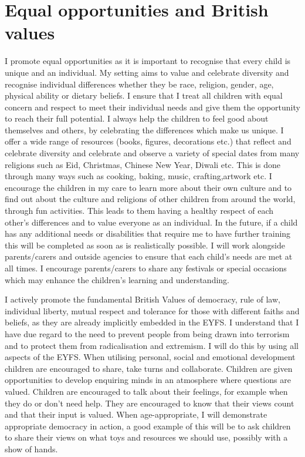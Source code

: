 \documentclass[10pt,a4paper]{report}
\begin{document}
\section{Equal opportunities and British values}

I promote equal opportunities as it is important to recognise that every child is unique and an individual. My setting aims to value and celebrate diversity and recognise individual differences whether they be race, religion, gender, age, physical ability or dietary beliefs. I ensure that I treat all children with equal concern and respect to meet their individual needs and give them the opportunity to reach their full potential. I always help the children to feel good about themselves and others, by celebrating the differences which make us unique. I offer a wide range of resources (books, figures, decorations etc.) that reflect and celebrate diversity and celebrate and observe a variety of special dates from many religions such as Eid, Christmas, Chinese New Year, Diwali etc. This is done through many ways such as cooking, baking, music, crafting,artwork etc. I encourage the children in my care to learn more about their own culture and to find out about the culture and religions of other children from around the world, through fun activities. This leads to them having a healthy respect of each other’s differences and to value everyone as an individual. In the future, if a child has any additional needs or disabilities that require me to have further training this will be completed as soon as is realistically possible. I will work alongside parents/carers and outside agencies to ensure that each child’s needs are met at all times. I encourage parents/carers to share any festivals or special occasions which may enhance the children’s learning and understanding.

I actively promote the fundamental British Values of democracy, rule of law, individual liberty, mutual respect and tolerance for those with different faiths and beliefs, as they are already implicitly embedded in the EYFS. I understand that I have due regard to the need to prevent people from being drawn into terrorism and to protect them from radicalisation and extremism. I will do this by using all aspects of the EYFS. When utilising personal, social and emotional development children are encouraged to share, take turns and collaborate. Children are given opportunities to develop enquiring minds in an atmosphere where questions are valued. Children are encouraged to talk about their feelings, for example when they do or don't need help. They are encouraged to know that their views count and that their input is valued. When age-appropriate, I will demonstrate appropriate democracy in action, a good example of this will be to ask children to share their views on what toys and resources we should use, possibly with a show of hands.
\end{document}
